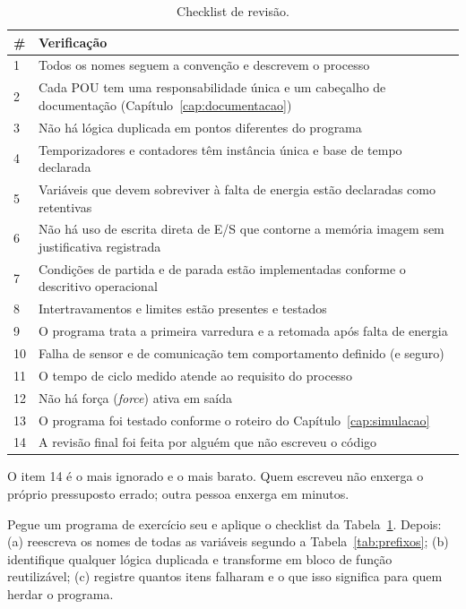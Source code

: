 \begin{table}[H]
  \centering
  \caption{Checklist de revisão.}
  \label{tab:checklist-codigo}
  \begin{tabular}{p{0.9cm} p{13.7cm}}
    \toprule
    \# & Verificação \\
    \midrule
    1 & Todos os nomes seguem a convenção e descrevem o processo \\
    2 & Cada POU tem uma responsabilidade única e um cabeçalho de documentação
        (Capítulo~\ref{cap:documentacao}) \\
    3 & Não há lógica duplicada em pontos diferentes do programa \\
    4 & Temporizadores e contadores têm instância única e base de tempo declarada \\
    5 & Variáveis que devem sobreviver à falta de energia estão declaradas como retentivas \\
    6 & Não há uso de escrita direta de E/S que contorne a memória imagem sem justificativa registrada \\
    7 & Condições de partida e de parada estão implementadas conforme o descritivo operacional \\
    8 & Intertravamentos e limites estão presentes e testados \\
    9 & O programa trata a primeira varredura e a retomada após falta de energia \\
    10 & Falha de sensor e de comunicação tem comportamento definido (e seguro) \\
    11 & O tempo de ciclo medido atende ao requisito do processo \\
    12 & Não há força (\emph{force}) ativa em saída \\
    13 & O programa foi testado conforme o roteiro do Capítulo~\ref{cap:simulacao} \\
    14 & A revisão final foi feita por alguém que não escreveu o código \\
    \bottomrule
  \end{tabular}
\end{table}

O item 14 é o mais ignorado e o mais barato. Quem escreveu não enxerga o próprio pressuposto errado;
outra pessoa enxerga em minutos.

\begin{pratica}
Pegue um programa de exercício seu e aplique o checklist da Tabela~\ref{tab:checklist-codigo}.
Depois:
(a) reescreva os nomes de todas as variáveis segundo a Tabela~\ref{tab:prefixos};
(b) identifique qualquer lógica duplicada e transforme em bloco de função reutilizável;
(c) registre quantos itens falharam e o que isso significa para quem herdar o programa.
\end{pratica}

